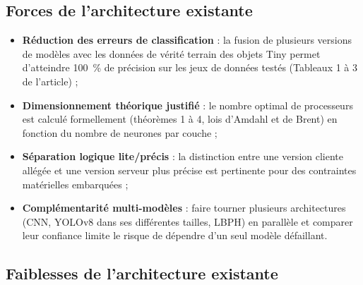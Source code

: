 \documentclass[11pt,a4paper]{article}
\begin{document}
\subsection{Forces de l'architecture existante}

\begin{itemize}
    \item \textbf{Réduction des erreurs de classification} : la fusion de
    plusieurs versions de modèles avec les données de vérité terrain des
    objets Tiny permet d'atteindre 100~\% de précision sur les jeux de
    données testés (Tableaux 1 à 3 de l'article) ;
    \item \textbf{Dimensionnement théorique justifié} : le nombre optimal
    de processeurs est calculé formellement (théorèmes 1 à 4, lois
    d'Amdahl et de Brent) en fonction du nombre de neurones par couche ;
    \item \textbf{Séparation logique lite/précis} : la distinction entre
    une version cliente allégée et une version serveur plus précise est
    pertinente pour des contraintes matérielles embarquées ;
    \item \textbf{Complémentarité multi-modèles} : faire tourner plusieurs
    architectures (CNN, YOLOv8 dans ses différentes tailles, LBPH) en
    parallèle et comparer leur confiance limite le risque de dépendre d'un
    seul modèle défaillant.
\end{itemize}

\subsection{Faiblesses de l'architecture existante}
\end{document}
